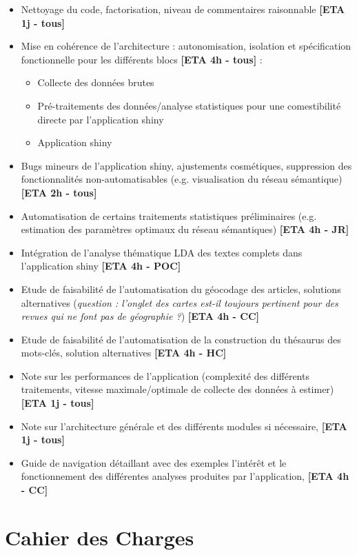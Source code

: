 \documentclass[11pt]{article}
\begin{document}
\begin{itemize}
\item Nettoyage du code, factorisation, niveau de commentaires raisonnable \textbf{[ETA 1j - tous]}
\item Mise en cohérence de l'architecture : autonomisation, isolation et spécification fonctionnelle pour les différents blocs \textbf{[ETA 4h - tous]} : 
\begin{itemize}
\item Collecte des données brutes
\item Pré-traitements des données/analyse statistiques pour une comestibilité directe par l'application shiny
\item Application shiny
\end{itemize}
\item Bugs mineurs de l'application shiny, ajustements cosmétiques, suppression des fonctionnalités non-automatisables (e.g. visualisation du réseau sémantique) \textbf{[ETA 2h - tous]}
\item Automatisation de certains traitements statistiques préliminaires (e.g. estimation des paramètres optimaux du réseau sémantiques) \textbf{[ETA 4h - JR]}
\item Intégration de l'analyse thématique LDA des textes complets dans l'application shiny \textbf{[ETA 4h - POC]}
\item Etude de faisabilité de l'automatisation du géocodage des articles, solutions alternatives (\textit{question : l'onglet des cartes est-il toujours pertinent pour des revues qui ne font pas de géographie ?}) \textbf{[ETA 4h - CC]}
\item Etude de faisabilité de l'automatisation de la construction du thésaurus des mots-clés, solution alternatives \textbf{[ETA 4h - HC]}
\item Note sur les performances de l'application (complexité des différents traitements, vitesse maximale/optimale de collecte des données à estimer) \textbf{[ETA 1j - tous]}
\item Note sur l'architecture générale et des différents modules si nécessaire,  \textbf{[ETA 1j - tous]}
\item Guide de navigation détaillant avec des exemples l'intér{\^e}t et le fonctionnement des différentes analyses produites par l'application,  \textbf{[ETA 4h - CC]}
\end{itemize}



\section{Cahier des Charges}
\end{document}
